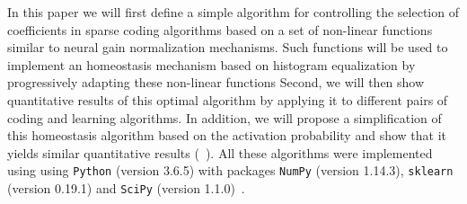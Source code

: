 \documentclass[a4paper, 11pt, draft]{article} %
\begin{document}
In this paper we will first define a simple algorithm for controlling the selection of coefficients in sparse coding algorithms based on a set of non-linear functions similar to neural gain normalization mechanisms. Such functions will be used to implement an homeostasis mechanism based on histogram equalization by progressively adapting these non-linear functions
Second, we will then show quantitative results of this optimal algorithm by applying it to different pairs of coding and learning algorithms. %
In addition, we will propose a simplification of this homeostasis algorithm based on the activation probability and show that it yields similar quantitative results (~\citep{Olshausen97, Sandin17}).
All these algorithms were implemented using using \verb+Python+ (version 3.6.5)
with packages \verb+NumPy+ (version 1.14.3), \verb+sklearn+ (version 0.19.1) and \verb+SciPy+ (version 1.1.0)~\citep{Oliphant07}.
\end{document}
